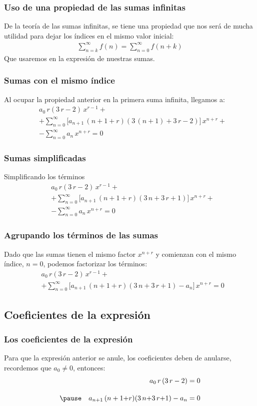 \documentclass[12pt]{beamer}
\begin{document}
\begin{frame}
\frametitle{Uso de una propiedad de las sumas infinitas}
De la teoría de las sumas infinitas, se tiene una propiedad que nos será de mucha utilidad para dejar los índices en el mismo valor inicial:
\pause
\begin{align*}
\sum_{n = k}^{\infty} f(n) = \sum_{n=0}^{\infty} f(n + k)
\end{align*}
Que usaremos en la expresión de nuestras sumas.
\end{frame}
\begin{frame}
\frametitle{Sumas con el mismo índice}
Al ocupar la propiedad anterior en la primera suma infinita, llegamos a:
\begin{align*}
&a_{0} \, r (3 \, r {-}  2) \, x^{r-1} + \\[1em]
&+ \sum_{n=0}^{\infty} \bigg[ a_{n+1} \, (n + 1 {+} r) (3 \, (n + 1) {+}  3 \, r {-} 2 ) \bigg] \, x^{n+r} + \\[1em]
&- \sum_{n=0}^{\infty} a_{n} \, x^{n+r} = 0
\end{align*}
\end{frame}
\begin{frame}
\frametitle{Sumas simplificadas}
Simplificando los términos
\begin{align*}
&a_{0} \, r (3 \, r {-}  2) \, x^{r-1} + \\[1em]
&+ \sum_{n=0}^{\infty} \bigg[ a_{n+1} \, (n + 1 {+} r) (3 \, n {+}  3 \, r {+} 1 ) \bigg] \, x^{n+r} + \\[1em]
&- \sum_{n=0}^{\infty} a_{n} \, x^{n+r} = 0
\end{align*}
\end{frame}
\begin{frame}
\frametitle{Agrupando los términos de las sumas}
Dado que las sumas tienen el mismo factor $x^{n+r}$ y comienzan con el mismo índice, $n = 0$, podemos factorizar los términos:
\pause
\begin{align*}
&a_{0} \, r (3 \, r {-}  2) \, x^{r-1} + \\[1em]
&+ \sum_{n=0}^{\infty} \bigg[ a_{n+1} \, (n + 1 {+} r) (3 \, n {+}  3 \, r {+} 1 ) - a_{n} \bigg] \, x^{n+r} = 0
\end{align*}    
\end{frame}

\subsection*{Coeficientes de la expresión}

\begin{frame}
\frametitle{Los coeficientes de la expresión}
Para que la expresión anterior se anule, los coeficientes deben de anularse, recordemos que $a_{0} \neq 0$, entonces:
\pause
\begin{eqnarray}
&{}& a_{0} \, r \, (3 \, r - 2) = 0 \label{eq:ecuacion_indices}\\[1em] \pause
&{}& a_{n+1} \, (n + 1 {+} r) (3 \, n {+}  3 \, r {+} 1 ) - a_{n} = 0 \label{eq:ecuacion_recurrencia}
\end{eqnarray}
\end{frame}
\end{document}
